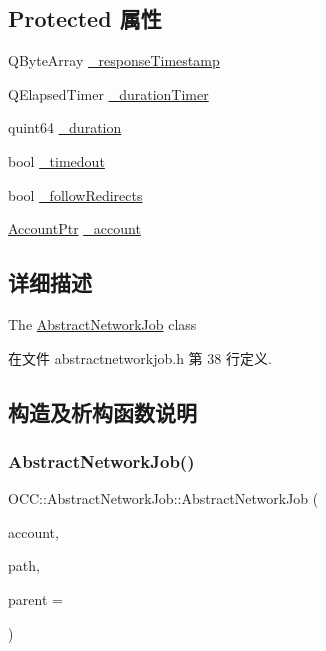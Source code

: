 \subsection*{Protected 属性}
\begin{DoxyCompactItemize}
\item 
Q\+Byte\+Array \hyperlink{class_o_c_c_1_1_abstract_network_job_a135fa86efd55fdcd58d0c28c70ac12d1}{\+\_\+response\+Timestamp}
\item 
Q\+Elapsed\+Timer \hyperlink{class_o_c_c_1_1_abstract_network_job_a3a21a8d9ea34db5b052f4b8fa295bf9f}{\+\_\+duration\+Timer}
\item 
quint64 \hyperlink{class_o_c_c_1_1_abstract_network_job_ac092a093062518c8f1cc4748d8e6ac2f}{\+\_\+duration}
\item 
bool \hyperlink{class_o_c_c_1_1_abstract_network_job_af29695f2d78215243f9db1e91a8302a5}{\+\_\+timedout}
\item 
bool \hyperlink{class_o_c_c_1_1_abstract_network_job_a2b69131b751618f6147a68f55c116ed7}{\+\_\+follow\+Redirects}
\item 
\hyperlink{namespace_o_c_c_a848616aedb9188e223c6b9867757fe69}{Account\+Ptr} \hyperlink{class_o_c_c_1_1_abstract_network_job_a5495f569442f06ad0ea646d9002d0525}{\+\_\+account}
\end{DoxyCompactItemize}


\subsection{详细描述}
The \hyperlink{class_o_c_c_1_1_abstract_network_job}{Abstract\+Network\+Job} class 

在文件 abstractnetworkjob.\+h 第 38 行定义.



\subsection{构造及析构函数说明}
\mbox{\label{class_o_c_c_1_1_abstract_network_job_a04e6dd9d09247f2856f9e878bc29cd65}} 
\subsubsection{\texorpdfstring{Abstract\+Network\+Job()}{AbstractNetworkJob()}}
{\footnotesize\ttfamily O\+C\+C\+::\+Abstract\+Network\+Job\+::\+Abstract\+Network\+Job (\begin{DoxyParamCaption}\item[{\hyperlink{namespace_o_c_c_a848616aedb9188e223c6b9867757fe69}{Account\+Ptr}}]{account,  }\item[{const Q\+String \&}]{path,  }\item[{Q\+Object $\ast$}]{parent = {} }\end{DoxyParamCaption})\hspace{0.3cm}{\ttfamily [explicit]}}

